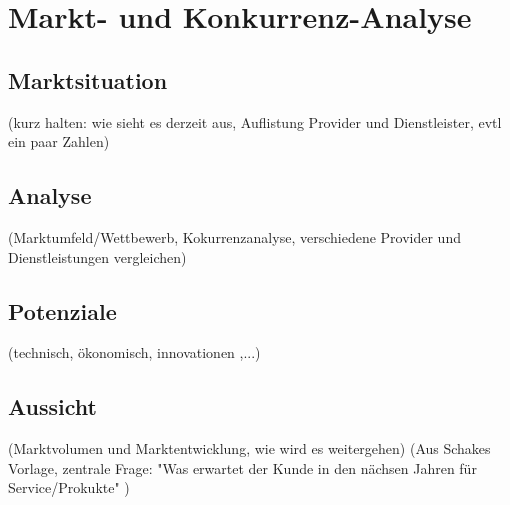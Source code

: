\section{Markt- und Konkurrenz-Analyse}

\subsection{Marktsituation}
(kurz halten: wie sieht es derzeit aus, Auflistung Provider und Dienstleister, evtl ein paar Zahlen)

\subsection{Analyse}
(Marktumfeld/Wettbewerb, Kokurrenzanalyse, verschiedene Provider und Dienstleistungen vergleichen)

\subsection{Potenziale}
(technisch, ökonomisch, innovationen ,...)


\subsection{Aussicht}
(Marktvolumen und Marktentwicklung, wie wird es weitergehen)
(Aus Schakes Vorlage, zentrale Frage: "Was erwartet der Kunde in den nächsen Jahren für Service/Prokukte" )
